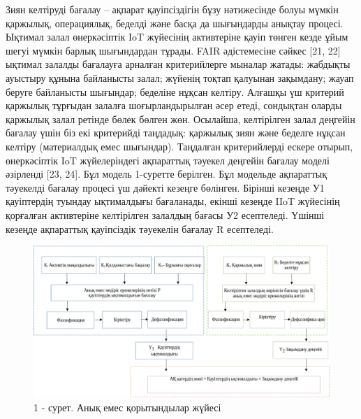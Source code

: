 \begin{multicols}{2}
Зиян келтіруді бағалау -- ақпарат қауіпсіздігін бұзу нәтижесінде болуы
мүмкін қаржылық, операциялық, беделді және басқа да шығындарды анықтау
процесі. Ықтимал залал өнеркәсіптік IoT жүйесінің активтеріне қауіп
төнген кезде ұйым шегуі мүмкін барлық шығындардан тұрады. FAIR
әдістемесіне сәйкес {[}21, 22{]} ықтимал залалды бағалауға арналған
критерийлерге мыналар жатады: жабдықты ауыстыру құнына байланысты залал;
жүйенің тоқтап қалуынан зақымдану; жауап беруге байланысты шығындар;
беделіне нұқсан келтіру. Алғашқы үш критерий қаржылық тұрғыдан залалға
шоғырландырылған әсер етеді, сондықтан оларды қаржылық залал ретінде
бөлек бөлген жөн. Осылайша, келтірілген залал деңгейін бағалау үшін біз
екі критерийді таңдадық: қаржылық зиян және беделге нұқсан келтіру
(материалдық емес шығындар). Таңдалған критерийлерді ескере отырып,
өнеркәсіптік IoT жүйелеріндегі ақпараттық тәуекел деңгейін бағалау
моделі әзірленді {[}23, 24{]}. Бұл модель 1-суретте берілген. Бұл
модельде ақпараттық тәуекелді бағалау процесі үш дәйекті кезеңге
бөлінген. Бірінші кезеңде У1 қауіптердің туындау ықтималдығы бағаланады,
екінші кезеңде IIoT жүйесінің қорғалған активтеріне келтірілген залалдың
бағасы У2 есептеледі. Үшінші кезеңде ақпараттық қауіпсіздік тәуекелін
бағалау R есептеледі.
\end{multicols}

\begin{figure}[H]
	\centering
	\includegraphics[width=\textwidth]{media/ict/image27.1}
	\caption*{1 - сурет. Анық емес қорытындылар жүйесі}
\end{figure}


